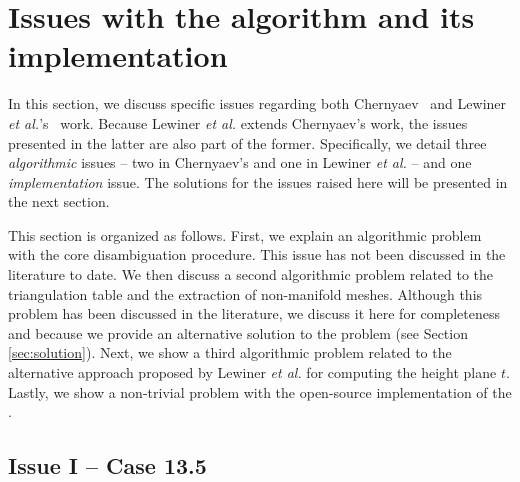 \section{Issues with the \mc{} algorithm and its implementation}
\label{erros_cause:chernyaev}

In this section, we discuss specific issues regarding both Chernyaev~\cite{Chernyaev95marchingcubes} and Lewiner \emph{et al.}'s~\cite{Lewiner:2003} work. Because Lewiner \emph{et al.} extends Chernyaev's work, the issues presented in the latter are also part of the former. Specifically, we detail three \emph{algorithmic} issues -- two in Chernyaev's \mc{} and one in Lewiner \emph{et al.}  --  and one \emph{implementation} issue. The solutions for the issues raised here will be presented in the next section.

This section is organized as follows. First, we explain an algorithmic problem with the \mc{} core disambiguation procedure. This issue has not been discussed in the literature to date. We then discuss a second algorithmic problem related to the triangulation table and the extraction of non-manifold meshes. Although this problem has been discussed in the literature, we discuss it here for completeness and because we provide an alternative  solution to the problem (see Section \ref{sec:solution}). Next, we show a third algorithmic problem related to the alternative approach proposed by Lewiner \emph{et al.} for computing the height plane $t$. Lastly, we show a non-trivial problem with the open-source implementation of the \mc{}. 

\subsection{Issue I -- Case 13.5}
\label{sec:problem-case-13}

